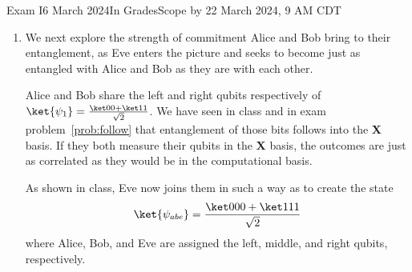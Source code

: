 \documentclass[12pt]{article}
\newcommand{\Blank}[1][1in]{\mbox{\vrule width #1 depth 2pt}\vrule width 0pt height 2.0em}
\begin{document}
\begin{assignment}{Exam I}{6 March 2024}{In GradesScope by 22 March 2024, 9 AM CDT}
\begin{enumerate}
In \texttt{bellstatepersists.txt} we define the gate \[U = \begin{pmatrix*}[r] a & b \\ c & d\end{pmatrix*}\]
with $a, b, c, d$ all real-valued, to make matters
simple.  You can keep those values real for the rest of this problem as well.
\Continued{}
With \texttt{Matlab} as your (perhaps recent) faithful friend, complete the equation below to show what happens if Alice and Bob each apply $U$ (as defined above) to  (be sure to represent the sign on  properly for ):
\[
\ket{\psi_{2}} = (U\otimes U)\ket{\psi_{1}} = \frac{1}{\sqrt{2}}\begin{pmatrix*}[r]
\Blank[3em]{} \\
\Blank[7em]{} \\
\Blank[7em]{} \\
\Blank[3em]{} 
\end{pmatrix*}
\]

Here is a useful fact (mention this in passing at your next party):  
\[ \mbox{If $U$ is unitary then }\left|\mbox{det}(U)\right| =  1 \]

That is, the determinant of a unitary matrix has magnitude~$1$.

Equipped, aware, and fascinated by that useful fact, prove that
\[ \ket{\psi_{2}} \equiv \BellM{}\]
In other words, Alice and Bob can apply $U$ to this other Bell state  and they still have (up to a global phase) state .  

Your proof below:
\LeaveSpace{2in}
If Alice and Bob begin in state , does that entanglement follow them after any $U$ is applied to each qubit, so that their measurements consistently disagree?\Blank{}
\clearpage\item{}
We next explore the strength of commitment Alice and Bob bring to their
entanglement, as Eve enters the picture and seeks to become just as entangled
with Alice and Bob as they are with each other.

Alice and Bob share the left and right qubits respectively of $\ket{\psi_{1}}=\Bell{}$.
We have seen in class and in exam problem~\ref{prob:follow} that entanglement of those bits follows into the 
\textbf{X} basis.  If they both measure their qubits in the \textbf{X} basis,
the outcomes are just as correlated as they would be in the computational
basis.

As shown in class, Eve now joins them in such a way as to create the state
\[
\ket{\psi_{abe}} = \BellTwo{000}{111}
\]
where Alice, Bob, and Eve are assigned the left, middle, and right qubits,
respectively.


\end{enumerate}
\end{assignment}
\end{document}
